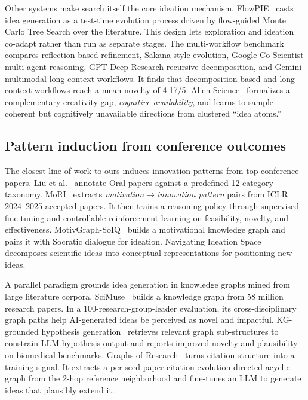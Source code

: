 \documentclass[10pt,a4paper]{article}
\begin{document}
Other systems make search itself the core ideation mechanism. FlowPIE~\cite{wang2026flowpie} casts idea generation as a test-time evolution process driven by flow-guided Monte Carlo Tree Search over the literature. This design lets exploration and ideation co-adapt rather than run as separate stages. The multi-workflow benchmark~\cite{multiworkflow2026} compares reflection-based refinement, Sakana-style evolution, Google Co-Scientist multi-agent reasoning, GPT Deep Research recursive decomposition, and Gemini multimodal long-context workflows. It finds that decomposition-based and long-context workflows reach a mean novelty of 4.17/5. Alien Science~\cite{alienscience2026} formalizes a complementary creativity gap, \emph{cognitive availability}, and learns to sample coherent but cognitively unavailable directions from clustered ``idea atoms.''

\subsection{Pattern induction from conference outcomes}
\label{subsec:related-induction}

The closest line of work to ours induces innovation patterns from top-conference papers. Liu et al.~\cite{wang2024scireasoning} annotate Oral papers against a predefined 12-category taxonomy. MoRI~\cite{moRI2026} extracts \emph{motivation}\(\to\)\emph{innovation pattern} pairs from ICLR 2024--2025 accepted papers. It then trains a reasoning policy through supervised fine-tuning and controllable reinforcement learning on feasibility, novelty, and effectiveness. MotivGraph-SoIQ~\cite{motivgraph2025} builds a motivational knowledge graph and pairs it with Socratic dialogue for ideation. Navigating Ideation Space~\cite{navigating_ideation2026} decomposes scientific ideas into conceptual representations for positioning new ideas.

A parallel paradigm grounds idea generation in knowledge graphs mined from large literature corpora. SciMuse~\cite{scimuse2024} builds a knowledge graph from 58 million research papers. In a 100-research-group-leader evaluation, its cross-disciplinary graph paths help AI-generated ideas be perceived as novel and impactful. KG-grounded hypothesis generation~\cite{kghyp2024} retrieves relevant graph sub-structures to constrain LLM hypothesis output and reports improved novelty and plausibility on biomedical benchmarks. Graphs of Research~\cite{gao2026graphsofresearch} turns citation structure into a training signal. It extracts a per-seed-paper citation-evolution directed acyclic graph from the 2-hop reference neighborhood and fine-tunes an LLM to generate ideas that plausibly extend it.
\end{document}
